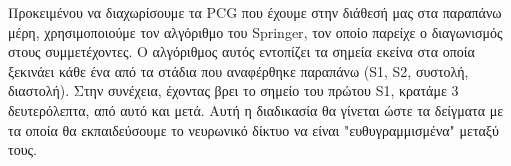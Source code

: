 \documentclass[../main.tex]{subfiles}
\begin{document}
Προκειμένου να διαχωρίσουμε τα PCG που έχουμε στην διάθεσή μας στα παραπάνω
μέρη, χρησιμοποιούμε τον αλγόριθμο του Springer\cite{springer2015logistic}, τον
οποίο  παρείχε ο διαγωνισμός στους συμμετέχοντες. Ο αλγόριθμος αυτός εντοπίζει
τα σημεία εκείνα στα οποία ξεκινάει κάθε ένα από τα στάδια που αναφέρθηκε
παραπάνω (S1, S2, συστολή, διαστολή). Στην συνέχεια, έχοντας βρει το σημείο του
πρώτου S1, κρατάμε 3 δευτερόλεπτα, από αυτό και μετά. Αυτή η διαδικασία θα
γίνεται ώστε τα δείγματα με τα οποία θα εκπαιδεύσουμε το νευρωνικό δίκτυο να
είναι "ευθυγραμμισμένα" μεταξύ τους.
\end{document}
